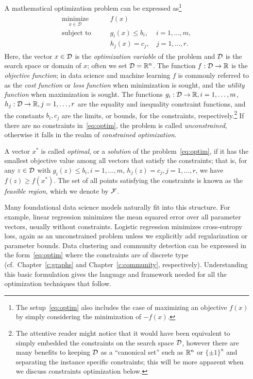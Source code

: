 A mathematical optimization problem can be expressed as\footnote{The setup~\eqref{eq:optim} also includes the case of maximizing an objective $f(x)$ by simply considering the minimization of $-f(x)$.}
\begin{align}\label{eq:optim}
\begin{split}
\underset{x \in \mathcal{D}}{\operatorname{minimize}} & \qquad   f(x)  \\
 \text{subject to} & \qquad g_i(x) \le b_i, \quad \, i = 1, \dots, m, \\
 & \qquad h_j(x) = c_j, \quad j=1,\dots,r.
\end{split}
\end{align}
Here, the vector $x \in {\mathcal D}$ is the {\em optimization variable} of the problem and ${\mathcal D}$ is the search space or domain of $x$; often we set ${\mathcal D} = \mathbb{R}^n$. The
function $f: {\mathcal D} \to \mathbb{R}$ is the {\em objective function}; in data science and machine learning $f$ is commonly referred to as the {\em cost function} or {\em loss function} when minimization is sought, and the {\em utility function}  when maximization is sought.
The functions
$g_i: {\mathcal D} \to \mathbb{R}, i=1,\dots,m$,  $h_j: {\mathcal D} \to \mathbb{R}, j=1,\dots,r$ are the equality and inequality constraint functions, and the constants $b_i, c_j$
are the limits, or bounds, for the constraints, respectively.\footnote{The attentive reader might notice that it would have been equivalent to simply embedded the constraints on the search space ${\mathcal D}$, however there are many benefits to keeping ${\mathcal D}$ as a ``canonical set'' such as $\mathbb{R}^n$ or $\{\pm1\}^n$ and separating the instance specific constraints; this will be more apparent when we discuss constraints optimization below.} If there are no constraints in~\eqref{eq:optim}, the problem is called {\em unconstrained}, otherwise it falls in the realm of {\em constrained optimization}. 

A vector $x^*$ is called {\em optimal}, or a
{\em solution} of the problem~\eqref{eq:optim}, if it has the smallest objective value among all vectors that satisfy the constraints; that is, for any $z\in{\mathcal D}$ with $g_i(z) \le b_i, i=1,\dots,m$, $h_j(z) = c_j, j=1,\dots,r$, we have $f(z) \ge f(x^*)$. 
The set of all points satisfying the constraints is known as the {\em feasible region}, which we denote by ${\mathcal F}$.



Many foundational data science models naturally fit into this structure.
For example, linear regression minimizes the mean squared error over all parameter vectors, usually without constraints. Logistic regression minimizes cross-entropy loss, again as an unconstrained problem unless we explicitly add regularization or parameter bounds. Data clustering and community detection can be expressed in the form~\eqref{eq:optim} where the constraints are of discrete type (cf.~Chapter~\ref{c:graphs} and Chapter~\ref{c:community}, respectively).
Understanding this basic formulation gives the language and framework needed for all the optimization techniques that follow.









